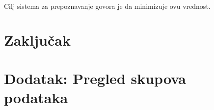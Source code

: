 \documentclass[a4paper]{article}
\begin{document}
Cilj sistema za prepoznavanje govora je da minimizuje ovu vrednost.

\section{Zaključak}
\label{sec:zakljucak}


\appendix
 
% 


\appendix

\section{Dodatak: Pregled skupova podataka}
\label{sec:skupovi}
\end{document}
